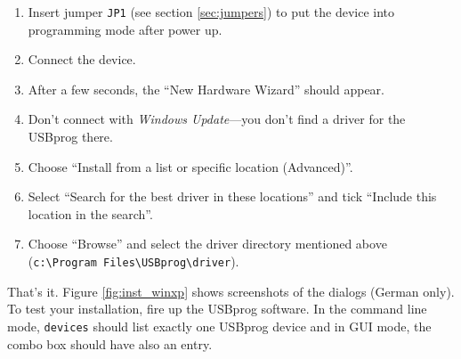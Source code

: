 \documentclass[bibtotoc,UKenglish,halfparskip,oneside,DIV12]{scrreprt}
\begin{document}
\begin{enumerate}
  \item Insert jumper \texttt{JP1} (see section \vref{sec:jumpers}) to put the device into
    programming mode after power up.
  \item Connect the device.
  \item After a few seconds, the ``New Hardware Wizard'' should appear.
  \item Don't connect with \emph{Windows Update}---you don't find a driver for the USBprog there.
  \item Choose ``Install from a list or specific location (Advanced)''.
  \item Select ``Search for the best driver in these locations'' and tick ``Include this location in
    the search''.
  \item Choose ``Browse'' and select the driver directory mentioned above \newline
    (\texttt{c:\textbackslash{}Program Files\textbackslash{}USBprog\textbackslash{}driver}).
\end{enumerate}

That's it. Figure \vref{fig:inst_winxp} shows screenshots of the dialogs (German only). To test your
installation, fire up the USBprog software. In the command line mode, \texttt{devices} should list
exactly one USBprog device and in GUI mode, the combo box should have also an entry.
\end{document}
